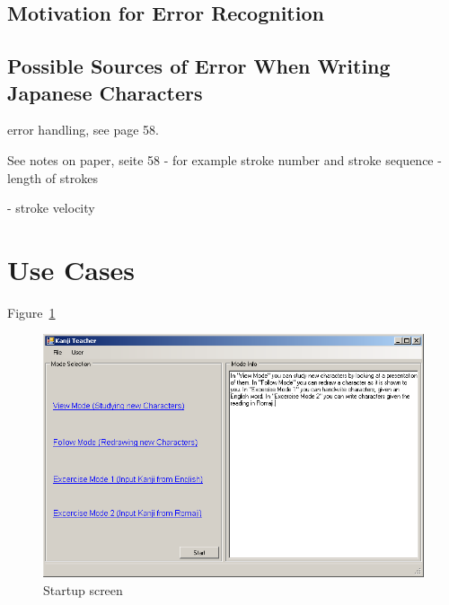 \subsection{Motivation for Error Recognition}
\label{sec:concept:motivationforerrorrecognition}


\subsection[Sources of Error]{Possible Sources of Error When Writing Japanese Characters}
\label{sec:concept:sourcesoferror}

error handling, see page 58.


See notes on paper, seite 58
- for example stroke number and stroke sequence
- length of strokes

- stroke velocity

\section{Use Cases}
\label{sec:concept:usecases}

Figure~\ref{fig:startupScreen}
\begin{figure}[htbp]
\begin{center}
\includegraphics[scale=0.7]{images/ConceptualDesign/startupScreen.png}
\caption{Startup screen}
\label{fig:startupScreen}
\end{center}
\end{figure}

